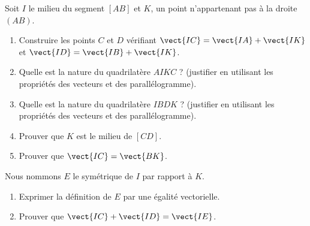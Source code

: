 
\begin{exercice}\label{exosmath-0076}

    Soit \( I\) le milieu du segment \( [AB]\) et \( K\), un point n'appartenant pas à la droite \( (AB)\).
    \begin{enumerate}
        \item
            Construire les points \( C\) et \( D\) vérifiant \( \vect{ IC }=\vect{ IA }+\vect{ IK }\) et \( \vect{ ID }=\vect{ IB }+\vect{ IK }\).
        \item
            Quelle est la nature du quadrilatère \( AIKC\) ? (justifier en utilisant les propriétés des vecteurs et des parallélogramme).
        \item
            Quelle est la nature du quadrilatère \( IBDK\) ? (justifier en utilisant les propriétés des vecteurs et des parallélogramme).
        \item
            Prouver que \( K\) est le milieu de \( [CD]\).
        \item
            Prouver que \( \vect{ IC }=\vect{ BK }\).
    \end{enumerate}
    Nous nommons \( E\) le symétrique de \( I\) par rapport à \( K\).
    \begin{enumerate}
        \item
            Exprimer la définition de \( E\) par une égalité vectorielle.
        \item
            Prouver que \( \vect{ IC }+\vect{ ID }=\vect{ IE }\).
    \end{enumerate}

\end{exercice}
